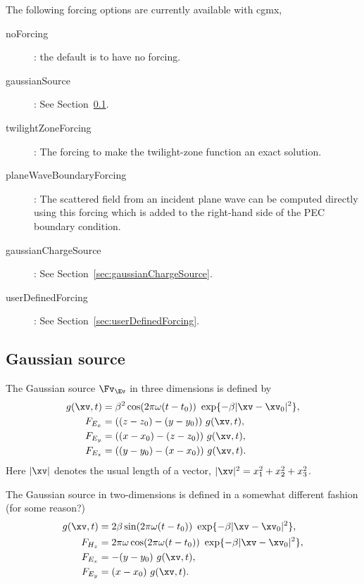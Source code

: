 \documentclass{article}
\begin{document}
\noindent The following forcing options are currently available with cgmx,
\begin{description}
  \item[noForcing]: the default is to have no forcing.
  \item[gaussianSource]: See Section~\ref{sec:gaussianSource}.
  \item[twilightZoneForcing]: The forcing to make the twilight-zone function an exact solution.
  \item[planeWaveBoundaryForcing]: The scattered field from an incident plane wave can be computed directly using this forcing
         which is added to the right-hand side of the PEC boundary condition.
  \item[gaussianChargeSource]: See Section~\ref{sec:gaussianChargeSource}.
  \item[userDefinedForcing] : See Section~\ref{sec:userDefinedForcing}.
\end{description}



\subsection{Gaussian source} \label{sec:gaussianSource}

The Gaussian source $\Fv_\Ev$ in three dimensions is defined by 
\begin{align*}
   g(\xv,t) & = \beta^2 \cos(2 \pi \omega(t-t_0)) ~\exp\{ -\beta |\xv-\xv_0|^2 \}, \\
   F_{E_x} &= ((z-z_0) - (y-y_0) ) ~g(\xv,t), \\ 
   F_{E_y} &= ((x-x_0) - (z-z_0) ) ~g(\xv,t), \\ 
   F_{E_z} &= ((y-y_0) - (x-x_0) ) ~g(\xv,t). 
\end{align*}
Here $|\xv|$ denotes the usual length of a vector, $|\xv|^2= x_1^2 + x_2^2 + x_3^2$.

\noindent The Gaussian source in two-dimensions is defined in a somewhat different fashion (for some reason?)
\begin{align*}
   g(\xv,t) & = 2 \beta \sin(2 \pi \omega(t-t_0)) ~\exp\{ -\beta |\xv-\xv_0|^2 \}, \\
   F_{H_z} &= 2 \pi\omega \cos(2 \pi \omega(t-t_0)) ~\exp\{ -\beta |\xv-\xv_0|^2 \}, \\
   F_{E_x} &= -(y-y_0)~g(\xv,t), \\ 
   F_{E_y} &=  (x-x_0)~g(\xv,t) .
\end{align*}
\end{document}
